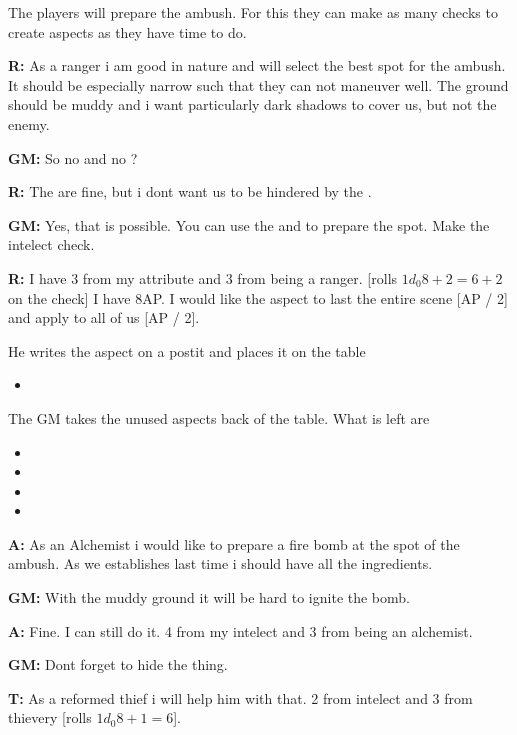 \documentclass[11pt]{article}
\begin{document}
{The players will prepare the ambush. For this they can make as many checks to create aspects as they have time to do.

\textbf{R:} As a ranger i am good in nature and will select the best spot for the ambush. It should be especially narrow such that they can not maneuver well. The ground should be muddy and i want particularly dark shadows to cover us, but not the enemy.

\textbf{GM:} So no  and no ?

\textbf{R:} The  are fine, but i dont want us to be hindered by the .

\textbf{GM:} Yes, that is possible. You can use the  and  to prepare the spot. Make the intelect check.

\textbf{R:} I have 3 from my attribute and 3 from being a ranger. [rolls \(1 d_0 8 + 2 = 6 + 2\) on the check] I have 8AP. I would like the aspect to last the entire scene [AP / 2] and apply to all of us [AP / 2].

He writes the aspect on a postit and places it on the table
\begin{itemize}
\item {}
\end{itemize}
The GM takes the unused aspects back of the table. What is left are
\begin{itemize}
\item {}
\item {}
\item {}
\item {}
\end{itemize}

\textbf{A:} As an Alchemist i would like to prepare a fire bomb at the spot of the ambush. As we establishes last time i should have all the ingredients.

\textbf{GM:} With the muddy ground it will be hard to ignite the bomb.

\textbf{A:} Fine. I can still do it. 4 from my intelect and 3 from being an alchemist.

\textbf{GM:} Dont forget to hide the thing.

\textbf{T:} As a reformed thief i will help him with that. 2 from intelect and 3 from thievery [rolls \(1 d_0 8 + 1 = 6\)].

}
\end{document}
